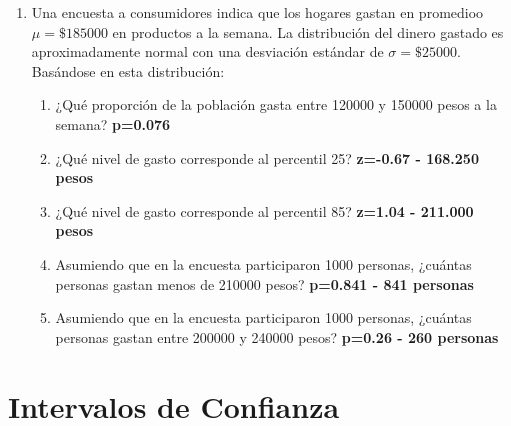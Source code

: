 \documentclass[letterpaper]{article}
\begin{document}
\begin{enumerate}
\item Una encuesta a consumidores indica que los hogares gastan en promedioo $\mu=\$ 185000$ en productos a la semana. La distribución del dinero gastado es aproximadamente normal con una desviación estándar de $\sigma=\$ 25000$. Basándose en esta distribución:
\begin{enumerate}
	\item ¿Qué proporción de la población gasta entre 120000 y 150000 pesos a la semana? {\bf p=0.076}
	\item ¿Qué nivel de gasto corresponde al percentil 25? {\bf z=-0.67 - 168.250 pesos}
	\item ¿Qué nivel de gasto corresponde al percentil 85? {\bf z=1.04 - 211.000 pesos}
	\item Asumiendo que en la encuesta participaron 1000 personas, ¿cuántas personas gastan menos de 210000 pesos? {\bf p=0.841 - 841 personas}
	\item Asumiendo que en la encuesta participaron 1000 personas, ¿cuántas personas gastan entre 200000 y 240000 pesos? {\bf p=0.26 - 260 personas}
\end{enumerate} 
\end{enumerate}


\section{Intervalos de Confianza}
\end{document}
